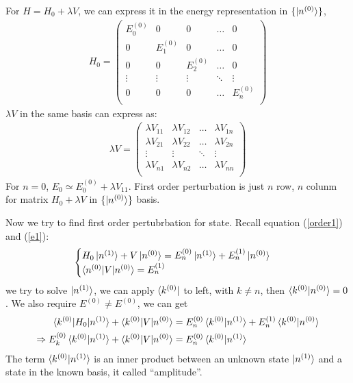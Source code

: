 \documentclass[UTF8,12pt]{article} %
\begin{document}
For $H=H_0+\lambda V$, we can express it in the energy representation in $\{\ket{n^{(0)}}\}$,
\begin{align}
H_0 = 
\begin{pmatrix}
     E^{(0)}_0& 0         & 0         & \ldots    & 0         \\
     0        & E^{(0)}_1 & 0         & \ldots    & 0         \\
     0        & 0         & E^{(0)}_2 & \ldots    & 0         \\
     \vdots   & \vdots    & \vdots    & \ddots    & \vdots    \\
     0        & 0         & 0         & \ldots    & E^{(0)}_n \\
\end{pmatrix}
\end{align}
$\lambda V$ in the same basis can express as:
\begin{align}
\lambda V = 
\begin{pmatrix}
    \lambda V_{11} & \lambda V_{12} & \ldots & \lambda V_{1n} \\
    \lambda V_{21} & \lambda V_{22} & \ldots & \lambda V_{2n} \\
    \vdots         & \vdots         & \ddots & \vdots         \\
    \lambda V_{n1} & \lambda V_{n2} & \ldots & \lambda V_{nn} \\
\end{pmatrix}
\end{align}
For $n=0$, $E_0\simeq E^{(0)}_0+\lambda V_{11}$. First order perturbation is just $n$ row, $n$ colunm for matrix $H_0+\lambda V$ in $\{\ket{n^{(0)}}\}$ basis.

Now we try to find first order pertubrbation for state. Recall equation (\ref{order1}) and (\ref{e1}):
\begin{align*}
\begin{cases}
H_0\ket{n^{(1)}}+V\ket{n^{(0)}} = E^{(0)}_n\ket{n^{(1)}}+E^{(1)}_n\ket{n^{(0)}} \\
\braket{n^{(0)}|V|n^{(0)}} = E^{(1)}_n
\end{cases}
\end{align*}
we try to solve $\ket{n^{(1)}}$, we can apply $\bra{k^{(0)}}$ to left, with $k\neq n$, then $\braket{k^{(0)}|n^{(0)}}=0$. We also require $E^{(0)} \neq E^{(0)}$, we can get 
\begin{align}
\braket{k^{(0)}|H_0|n^{(1)}}+\braket{k^{(0)}|V|n^{(0)}} &= E^{(0)}_n\braket{k^{(0)}|n^{(1)}}+E^{(1)}_n\braket{k^{(0)}|n^{(0)}} \\
\Rightarrow E^{(0)}_k\braket{ k^{(0)} | n^{(1)} }+\braket{k^{(0)}|V|n^{(0)}} &= E^{(0)}_n\braket{k^{(0)} | n^{(1)}} \label{ek}
\end{align}
The term $\braket{k^{(0)} | n^{(1)}}$ is an inner product between an unknown state $\ket{n^{(1)}}$ and a state in the known basis, it called ``amplitude''.
\end{document}
